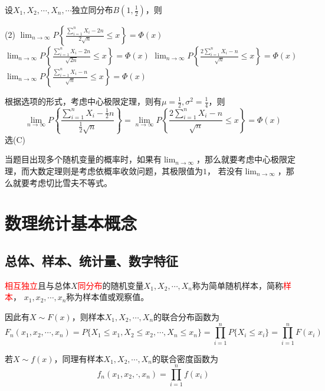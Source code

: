 \begin{example}
    设$X_1,X_2,\cdots,X_n,\cdots$独立同分布$B(1,\frac{1}{2})$，则
    \begin{tasks}[label=(\Alph*),label-width = 2em](2)
        \task $\displaystyle \lim_{n\to\infty} P\left\{ \frac{\sum_{i=1}^n X_i - 2n}{2\sqrt{n}} \leq x \right\}=\Phi(x)$
        \task $\displaystyle \lim_{n\to\infty} P\left\{ \frac{\sum_{i=1}^n X_i - 2n}{\sqrt{2n}} \leq x \right\}=\Phi(x)$
        \task $\displaystyle \lim_{n\to\infty} P\left\{ \frac{2\sum_{i=1}^n X_i - n}{\sqrt{n}} \leq x \right\}=\Phi(x)$
        \task $\displaystyle \lim_{n\to\infty} P\left\{ \frac{\sum_{i=1}^n X_i - n}{\sqrt{n}} \leq x \right\}=\Phi(x)$
    \end{tasks}
\end{example}
\begin{solution}
    根据选项的形式，考虑中心极限定理，则有$\mu = \frac{1}{2}, \sigma^2 = \frac{1}{4}$，则
    \[
        \lim_{n\to\infty} P\left\{ \frac{\sum_{i=1}^n X_i - \frac{1}{2}n}{\frac{1}{2}\sqrt{n}} \right\}
        = \lim_{n\to\infty} P\left\{ \frac{2\sum_{i=1}^n X_i - n}{\sqrt{n}} \leq x \right\}=\Phi(x)
    \]
    选(C)
\end{solution}

当题目出现多个随机变量的概率时，如果有$\lim_{n\to\infty}$，那么就要考虑中心极限定理，而大数定理则是考虑依概率收敛问题，其极限值为$1$，
若没有$\lim_{n\to\infty}$，那么就要考虑切比雪夫不等式。

\section{数理统计基本概念}
\subsection{总体、样本、统计量、数字特征}
\textcolor{red}{相互独立}且与总体$X$\textcolor{red}{同分布}的随机变量$X_1,X_2,\cdots,X_n$称为简单随机样本，简称\textcolor{red}{样本}，
$x_1,x_2,\cdots,x_n$称为样本值或观察值。

因此有$X\sim F(x)$，则样本$X_1,X_2,\cdots,X_n$的联合分布函数为
\begin{equation}
    F_n(x_1,x_2,\cdots,x_n)
    = P\{X_1\leq x_1, X_2\leq x_2,\cdots,X_n\leq x_n\}
    = \prod_{i=1}^n P\{X_i\leq x_i\}
    = \prod_{i=1}^n F(x_i)
\end{equation}

若$X\sim f(x)$，同理有样本$X_1,X_2,\cdots,X_n$的联合密度函数为
\begin{equation}
    f_n(x_1,x_2,\cdot,x_n) = \prod_{i=1}^n f(x_i)
\end{equation}

